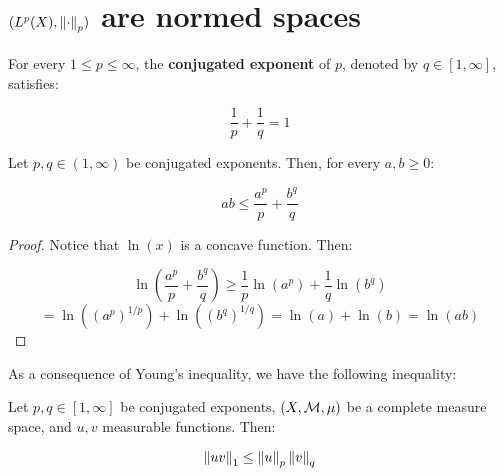 \section{$(L^p(X), \left\|\cdot\right\|_p)$ are normed spaces}

\begin{fdefinition}
    For every $1 \leq p \leq \infty$, the \textbf{conjugated exponent} of $p$,
    denoted by $q \in [1, \infty]$, satisfies:

    $$\frac{1}{p} + \frac{1}{q} = 1$$
    
\end{fdefinition}

\begin{flemma}
    Let $p, q \in (1, \infty)$ be conjugated exponents. Then, for every $a, b \geq 0$:

    $$ab \leq \frac{a^p}{p} + \frac{b^q}{q}$$
\end{flemma}

\begin{proof}
    Notice that $\ln(x)$ is a concave function. Then:

    $$\ln(\frac{a^p}{p} + \frac{b^q}{q}) \geq \frac{1}{p} \ln(a^p) + \frac{1}{q} \ln(b^q)$$
    $$= \ln((a^p)^{1/p}) + \ln((b^q)^{1/q}) = \ln(a) + \ln(b) = \ln(ab)$$

\end{proof}

\begin{note}
    As a consequence of Young's inequality, we have the
    following inequality:
\end{note}

\begin{flemma}
    Let $p, q \in [1, \infty]$ be conjugated exponents, $(X, \mathcal{M}, \mu)$ be a complete measure space,
    and $u, v$ measurable functions. Then:

    $$\left\|uv\right\|_1 \leq \left\|u\right\|_p \left\|v\right\|_q$$
\end{flemma}

